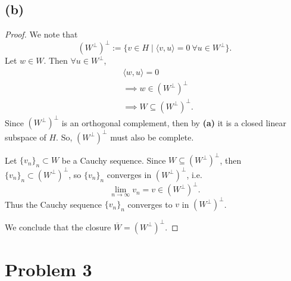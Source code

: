 \documentclass{article}
\begin{document}
\subsection*{(b)}
\begin{proof}
	We note that
	\begin{equation}
		\left(W^\perp\right)^\perp := \{v \in H \;|\; \langle v, u \rangle = 0 \: \forall u \in W^\perp\}.
	\end{equation}
	Let $w \in W$. Then $\forall u \in W^\perp$, 
	\begin{align}
		&\langle w, u \rangle = 0 \\
		&\implies w \in \left(W^\perp\right)^\perp \\
		&\implies W \subseteq \left(W^\perp\right)^\perp .
	\end{align}
	Since $\left(W^\perp\right)^\perp$ is an orthogonal complement, then by \textbf{(a)} it is a closed linear subspace of $H$. So, $\left(W^\perp\right)^\perp$ must also be complete.
	
	Let $\{v_n\}_n \subset W$ be a Cauchy sequence. Since $W \subseteq \left(W^\perp\right)^\perp$, then $\{v_n\}_n \subset \left(W^\perp\right)^\perp$, so $\{v_n\}_n$ converges in $\left(W^\perp\right)^\perp$, i.e.
	\begin{equation}
		\lim\limits_{n \to \infty} v_n = v \in \left(W^\perp\right)^\perp.
	\end{equation}
	Thus the Cauchy sequence $\{v_n\}_n$ converges to $v$ in $\left(W^\perp\right)^\perp$.
	
	We conclude that the closure $\overline{W} = \left(W^\perp\right)^\perp$.
\end{proof}
\section*{Problem 3}
\end{document}
